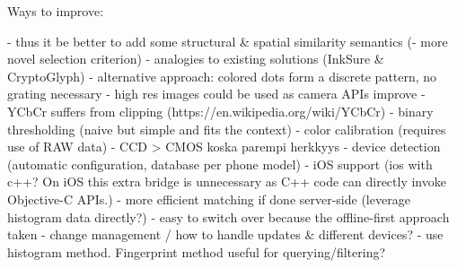 \documentclass[thesis.tex]{subfiles}
\begin{document}
Ways to improve:
\begin{comment}
Color calibration

There are mainly two modules responsible for the color-rendering accuracy of a digital camera: the former is the illuminant estimation and correction module, and the latter is the color matrix transformation aimed to adapt the color response of the sensor to a standard color space. These two modules together form what may be called the color correction pipeline.

RGB is a device-dependent color model: different devices detect or reproduce a given RGB value differently, since the color elements (such as phosphors or dyes) and their response to the individual R, G, and B levels vary from manufacturer to manufacturer, or even in the same device over time. Thus an RGB value does not define the same color across devices without some kind of color management.
\url{http://www.cis.rit.edu/~jxj1770/publications/paperEI_Xerox.pdf}
\url{http://www.cs.unc.edu/techreports/04-012.pdf}


\end{comment}

- thus it be better to add some structural \& spatial similarity semantics (- more novel selection criterion) - analogies to existing solutions (InkSure \& CryptoGlyph)
  - alternative approach: colored dots form a discrete pattern, no grating necessary
- high res images could be used as camera APIs improve
- YCbCr suffers from clipping (https://en.wikipedia.org/wiki/YCbCr)
- binary thresholding (naive but simple and fits the context)
- color calibration (requires use of RAW data)
  - CCD > CMOS koska parempi herkkyys
- device detection (automatic configuration, database per phone model)
- iOS support (ios with c++? On iOS this extra bridge is unnecessary as C++ code can directly invoke Objective-C APIs.)
- more efficient matching if done server-side (leverage histogram data directly?)
  - easy to switch over because the offline-first approach taken
- change management / how to handle updates \& different devices?
- use histogram method. Fingerprint method useful for querying/filtering?
\end{document}
